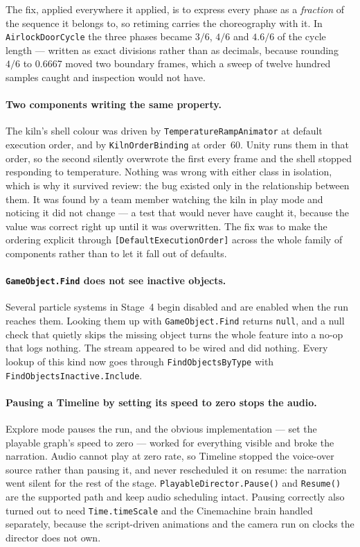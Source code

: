 The fix, applied everywhere it applied, is to express every phase as a
\emph{fraction} of the sequence it belongs to, so retiming carries the
choreography with it. In \texttt{AirlockDoorCycle} the three phases became $3/6$, $4/6$ and $4.6/6$ of the cycle length --- written as exact divisions rather than as decimals, because rounding $4/6$ to \num{0.6667} moved two boundary frames, which a sweep of twelve hundred samples caught and inspection would not have.

\paragraph{Two components writing the same property.}
The kiln's shell colour was driven by \texttt{TemperatureRampAnimator} at
default execution order, and by \texttt{KilnOrderBinding} at order~60. Unity runs them in that order, so the second silently overwrote the first every frame and the shell stopped responding to temperature. Nothing was wrong with either class in isolation, which is why it survived review: the bug existed only in the relationship between them. It was found by a team member watching the kiln in play mode and noticing it did not change --- a test that would never have caught
it, because the value was correct right up until it was overwritten. The fix was to make the ordering explicit through \texttt{[DefaultExecutionOrder]} across the whole family of components rather than to let it fall out of defaults.

\paragraph{\texttt{GameObject.Find} does not see inactive objects.}
Several particle systems in Stage~4 begin disabled and are enabled when the run reaches them. Looking them up with \texttt{GameObject.Find} returns \texttt{null}, and a null check that quietly skips the missing object turns the whole feature into a no-op that logs nothing. The stream appeared to be wired and did nothing. Every lookup of this kind now goes through \texttt{FindObjectsByType} with \texttt{FindObjectsInactive.Include}.

\paragraph{Pausing a Timeline by setting its speed to zero stops the audio.}
Explore mode pauses the run, and the obvious implementation --- set the playable graph's speed to zero --- worked for everything visible and broke the narration. Audio cannot play at zero rate, so Timeline stopped the voice-over source rather than pausing it, and never rescheduled it on resume: the narration went silent for the rest of the stage. \texttt{PlayableDirector.Pause()} and \texttt{Resume()} are the supported path and keep audio scheduling intact. Pausing correctly also turned out to need \texttt{Time.timeScale} and the Cinemachine brain handled separately, because the script-driven animations and
the camera run on clocks the director does not own.

